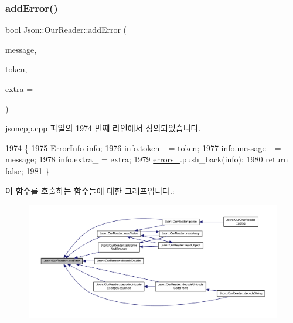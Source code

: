 \subsubsection{\texorpdfstring{add\+Error()}{addError()}}
{\footnotesize\ttfamily bool Json\+::\+Our\+Reader\+::add\+Error (\begin{DoxyParamCaption}\item[{const \hyperlink{json_8h_a1e723f95759de062585bc4a8fd3fa4be}{J\+S\+O\+N\+C\+P\+P\+\_\+\+S\+T\+R\+I\+NG} \&}]{message,  }\item[{\hyperlink{class_json_1_1_our_reader_1_1_token}{Token} \&}]{token,  }\item[{\hyperlink{class_json_1_1_our_reader_a1bdc7bbc52ba87cae6b19746f2ee0189}{Location}}]{extra = {} }\end{DoxyParamCaption})\hspace{0.3cm}{\ttfamily [private]}}



jsoncpp.\+cpp 파일의 1974 번째 라인에서 정의되었습니다.


\begin{DoxyCode}
1974                                                                                \{
1975   ErrorInfo info;
1976   info.token\_ = token;
1977   info.message\_ = message;
1978   info.extra\_ = extra;
1979   \hyperlink{class_json_1_1_our_reader_afb76b68ba1ab68fe09cf2838e3d4898d}{errors\_}.push\_back(info);
1980   \textcolor{keywordflow}{return} \textcolor{keyword}{false};
1981 \}
\end{DoxyCode}
이 함수를 호출하는 함수들에 대한 그래프입니다.\+:\nopagebreak
\begin{figure}[H]
\begin{center}
\leavevmode
\includegraphics[width=350pt]{class_json_1_1_our_reader_aa6a920311e6408ff3a45324d49da18a6_icgraph}
\end{center}
\end{figure}
\mbox{\label{class_json_1_1_our_reader_a074cf3d91e9404fe89e03cfc6a43e6fb}} 
